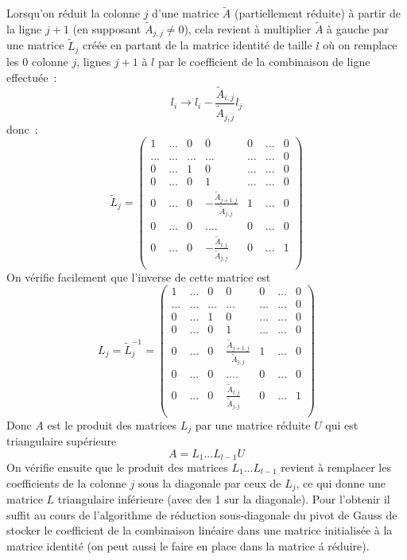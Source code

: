 \documentclass[a4paper,11pt]{article}
\begin{document}
 Lorsqu'on r\'eduit la colonne $j$ d'une matrice $\tilde{A}$
 (partiellement r\'eduite) \`a partir
de la ligne $j+1$ (en supposant $\tilde{A}_{j,j} \neq 0$), cela revient \`a
multiplier $\tilde{A}$ \`a gauche par une matrice $\tilde{L}_j$ cr\'e\'ee en
partant de la matrice
identit\'e de taille $l$ o\`u on remplace les 0 
colonne $j$, lignes $j+1$ \`a $l$ par 
le coefficient de la combinaison de ligne effectu\'ee~:
$$l_i \rightarrow l_i - \frac{\tilde{A}_{i,j}}{\tilde{A}_{j,j}} l_j $$
donc~:
\[ \tilde{L}_j = \left( \begin{array}{ccccccc}
1 & ... & 0   & 0 & 0 & ... & 0\\
...& ... & ... & ... & ... & ... & 0\\
0 & ... & 1   & 0 & ... & ... & 0\\
0 & ... & 0 & 1  & ... & ... & 0 \\
0 & ... & 0 & - \frac{\tilde{A}_{j+1,j}}{\tilde{A}_{j,j}} & 1 & ... & 0 \\
 0 & ... & 0  & .... & 0 & ... & 0 \\
0 & ... & 0 & - \frac{\tilde{A}_{l,j}}{\tilde{A}_{j,j}} & 0 & ... & 1\\
\end{array} \right) \]
On v\'erifie facilement que l'inverse de cette matrice est
\[ L_j = \tilde{L}_j^{-1} = \left( \begin{array}{ccccccc}
1 & ... & 0   & 0 & 0 & ... & 0\\
...& ... & ... & ... & ... & ... & 0\\
0 & ... & 1   & 0 & ... & ... & 0\\
0 & ... & 0 & 1  & ... & ... & 0 \\
0 & ... & 0 & \frac{\tilde{A}_{j+1,j}}{\tilde{A}_{j,j}} & 1 & ... & 0 \\
 0 & ... & 0  & .... & 0 & ... & 0 \\
0 & ... & 0 & \frac{\tilde{A}_{l,j}}{\tilde{A}_{j,j}} & 0 & ... & 1\\
\end{array} \right) \]
Donc $A$ est le produit des matrices $L_j$ par une matrice r\'eduite
$U$ qui est triangulaire sup\'erieure
\[ A= L_1...L_{l-1} U \]
On v\'erifie ensuite que le produit des matrices $L_1...L_{l-1}$ revient \`a
remplacer les coefficients de la colonne $j$ sous la diagonale 
par ceux de $L_j$, ce qui donne une matrice $L$ triangulaire
inf\'erieure (avec des 1 sur la diagonale). Pour l'obtenir il suffit
au cours de l'algorithme de r\'eduction sous-diagonale du 
pivot de Gauss de stocker le coefficient
de la combinaison lin\'eaire dans une matrice initialis\'ee
\`a la matrice identit\'e (on peut aussi le faire
en place dans la matrice \'a r\'eduire).
\end{document}
